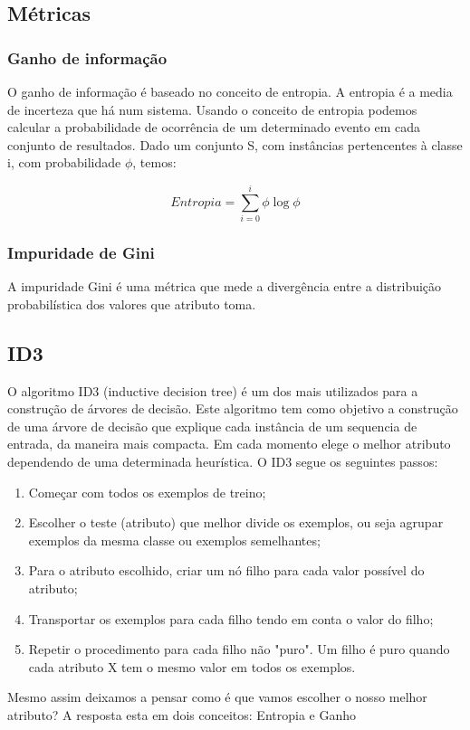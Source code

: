 \documentclass[12pt,a4paper]{article}
\begin{document}
\subsection{Métricas}
\subsubsection{Ganho de informação}
O ganho de informação é baseado no conceito de entropia.
A entropia é a media de incerteza que há num sistema. Usando o conceito de entropia podemos calcular a probabilidade de ocorrência de um determinado evento em cada conjunto de resultados.
Dado um conjunto S, com instâncias pertencentes à classe i, com probabilidade  $\phi$, temos:

\begin{equation}
	Entropia = \sum_{i=0}^{i} \phi\log\phi
\end{equation}

\subsubsection{Impuridade de Gini}
A impuridade Gini é uma métrica que mede a divergência entre a distribuição probabilística  dos valores que atributo toma.  

\subsection{ID3}
O algoritmo ID3 (inductive decision tree) é um dos mais utilizados para a construção de árvores de decisão. Este algoritmo tem como objetivo a construção de uma árvore de decisão que explique cada instância de um sequencia de entrada, da maneira mais compacta. Em cada momento elege o melhor atributo dependendo de uma determinada heurística.  
O ID3 segue os seguintes passos:
\begin{enumerate}
	\item 	Começar com todos os exemplos de treino;
	\item	Escolher o teste (atributo) que melhor divide os exemplos, ou seja agrupar exemplos da mesma classe ou exemplos semelhantes;
	\item	Para o atributo escolhido, criar um nó filho para cada valor possível do atributo;
	\item	Transportar os exemplos para cada filho tendo em conta o valor do filho;
	\item	Repetir o procedimento para cada filho não "puro". Um filho é puro quando cada atributo X tem o mesmo valor em todos os exemplos. 
\end{enumerate}
Mesmo assim deixamos a pensar como é que vamos escolher o nosso melhor atributo?  A resposta esta em dois conceitos: Entropia e Ganho
\end{document}
